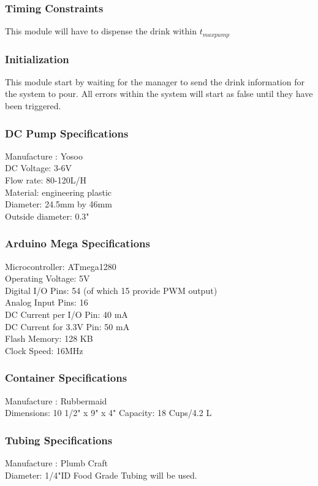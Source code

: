 \documentclass [10pt]{article}
\begin{document}
\subsubsection{Timing Constraints}
This module will have to dispense the drink within $ t_{maxpump} $

\subsubsection{Initialization}
This module start by waiting for the manager to send the drink information for the system to pour. All errors within the system will start as false until they have been triggered.

\subsubsection{DC Pump Specifications}
Manufacture : Yosoo \\
DC Voltage: 3-6V\\
Flow rate: 80-120L/H\\
Material: engineering plastic\\
Diameter: 24.5mm by 46mm \\
Outside diameter:  0.3" 

\subsubsection{Arduino Mega Specifications} 
Microcontroller:	ATmega1280\\
Operating Voltage:	5V\\
Digital I/O Pins: 54 (of which 15 provide PWM output)\\
Analog Input Pins: 16\\
DC Current per I/O Pin: 40 mA\\
DC Current for 3.3V Pin: 50 mA\\
Flash Memory: 128 KB\\
Clock Speed: 16MHz\\

\subsubsection{Container Specifications} 

Manufacture : Rubbermaid \\
Dimensions: 10 1/2" x 9" x 4" 
Capacity: 18 Cups/4.2 L\\
\subsubsection{Tubing Specifications}
Manufacture : Plumb Craft \\
Diameter: 1/4"ID Food Grade Tubing will be used.\\
\end{document}
